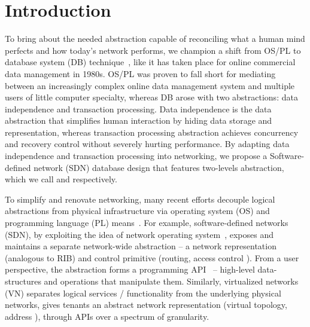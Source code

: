 \section{Introduction}
\label{sec:intro}

To bring about the needed abstraction capable of reconciling what a
human mind perfects and how today's network performs, we champion a
shift from OS/PL to database system (DB)
technique~\cite{Abiteboul:1995:alice,db-concept,db-meta}, like it has
taken place for online commercial data management in 1980s. OS/PL was
proven to fall short for mediating between an increasingly complex
online data management system and multiple users of little computer
specialty, whereas DB arose with two abstractions: data independence
and transaction processing. Data independence is the data abstraction
that simplifies human interaction by hiding data storage and
representation, whereas transaction processing abstraction achieves
concurrency and recovery control without severely hurting
performance. By adapting data independence and transaction processing
into networking, we propose a Software-defined network (SDN) database
design that features two-levels abstraction, which we call \TI and \TR
respectively.



To simplify and renovate networking, many recent efforts decouple
logical abstractions from physical infrastructure via operating system
(OS) and programming language (PL)
means~\cite{ethane-sigcomm07,rethinking-enterprise,shenker-tue}.  For
example, software-defined networks (SDN), by exploiting the idea of
network operating system~\cite{onix,nox}, exposes and maintains a
separate network-wide abstraction -- a network representation
(analogous to RIB) and control primitive (routing, access control
\etc).  From a user perspective, the abstraction forms a programming
API~\cite{composing,sdn-lang-frenetic} -- high-level data-structures
and operations that manipulate them.  Similarly, virtualized networks
(VN) separates logical services / functionality from the underlying
physical networks, gives tenants an abstract network representation
(virtual topology, address \etc), through APIs over a spectrum of
granularity.



